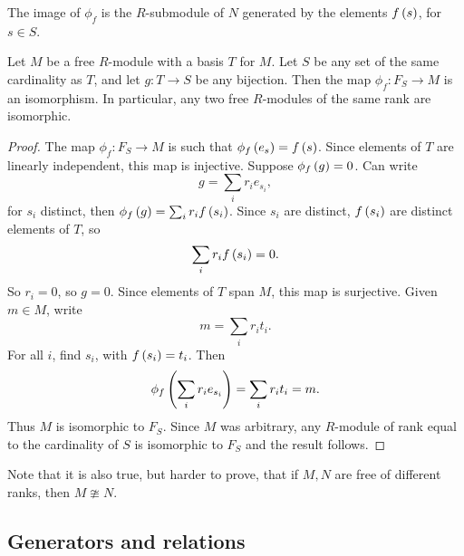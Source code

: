The image of $ \phi_f $ is the $ R $-submodule of $ N $ generated by the elements $ f\left( s \right) $, for $ s \in S $.

\begin{corollary}
Let $ M $ be a free $ R $-module with a basis $ T $ for $ M $. Let $ S $ be any set of the same cardinality as $ T $, and let $ g : T \to S $ be any bijection. Then the map $ \phi_f : F_S \to M $ is an isomorphism. In particular, any two free $ R $-modules of the same rank are isomorphic.
\end{corollary}

\begin{proof}
The map $ \phi_f : F_S \to M $ is such that $ \phi_f\left( e_s \right) = f\left( s \right) $. Since elements of $ T $ are linearly independent, this map is injective. Suppose $ \phi_f\left( g \right) = 0 $. Can write
$$ g = \sum_i r_ie_{s_i}, $$
for $ s_i $ distinct, then $ \phi_f\left( g \right) = \sum_i r_if\left( s_i \right) $. Since $ s_i $ are distinct, $ f\left( s_i \right) $ are distinct elements of $ T $, so
$$ \sum_i r_if\left( s_i \right) = 0. $$
So $ r_i = 0 $, so $ g = 0 $. Since elements of $ T $ span $ M $, this map is surjective. Given $ m \in M $, write
$$ m = \sum_i r_it_i. $$
For all $ i $, find $ s_i $, with $ f\left( s_i \right) = t_i $. Then
$$ \phi_f\left( \sum_i r_ie_{s_i} \right) = \sum_i r_it_i = m. $$
Thus $ M $ is isomorphic to $ F_S $. Since $ M $ was arbitrary, any $ R $-module of rank equal to the cardinality of $ S $ is isomorphic to $ F_S $ and the result follows.
\end{proof}

Note that it is also true, but harder to prove, that if $ M, N $ are free of different ranks, then $ M \ncong N $.


\subsection{Generators and relations}

